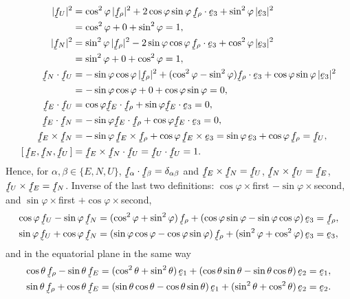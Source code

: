 \begin{solution}
\begin{align*}
   |\bff_{U}|^{2}&=\cos^{2}\varphi\,|\bff_{\rho}|^{2}
      +2\cos\varphi\sin\varphi\,\ip{\bff_{\rho}}{\be_{3}}
      +\sin^{2}\varphi\,|\be_{3}|^{2}\\
      &=\cos^{2}\varphi+0+\sin^{2}\varphi=1,\\
   |\bff_{N}|^{2}&=\sin^{2}\varphi\,|\bff_{\rho}|^{2}
      -2\sin\varphi\cos\varphi\,\ip{\bff_{\rho}}{\be_{3}}
      +\cos^{2}\varphi\,|\be_{3}|^{2}\\
      &=\sin^{2}\varphi+0+\cos^{2}\varphi=1,\\
   \ip{\bff_{N}}{\bff_{U}}
     &=-\sin\varphi\cos\varphi\,|\bff_{\rho}|^{2}
       +(\cos^{2}\varphi-\sin^{2}\varphi)\ip{\bff_{\rho}}{\be_{3}}
       +\cos\varphi\sin\varphi\,|\be_{3}|^{2}\\
     &=-\sin\varphi\cos\varphi+0+\cos\varphi\sin\varphi=0,\\
   \ip{\bff_{E}}{\bff_{U}}
     &=\cos\varphi\ip{\bff_{E}}{\bff_{\rho}}
       +\sin\varphi\ip{\bff_{E}}{\be_{3}}=0,\\
   \ip{\bff_{E}}{\bff_{N}}
     &=-\sin\varphi\ip{\bff_{E}}{\bff_{\rho}}
       +\cos\varphi\ip{\bff_{E}}{\be_{3}}=0,\\
   \bff_{E}\times\bff_{N}
     &=-\sin\varphi\,\bff_{E}\times\bff_{\rho}
       +\cos\varphi\,\bff_{E}\times\be_{3}
      =\sin\varphi\,\be_{3}+\cos\varphi\,\bff_{\rho}=\bff_{U},\\
   \tbox{\bff_{E}}{\bff_{N}}{\bff_{U}}
     &=\ip{\bff_{E}\times\bff_{N}}{\bff_{U}}
      =\ip{\bff_{U}}{\bff_{U}}=1 .
\end{align*}
Hence, for $\alpha,\beta\in\{E,N,U\}$,
$\ip{\bff_{\alpha}}{\bff_{\beta}}=\dd_{\alpha\beta}$ and
$\bff_{E}\times\bff_{N}=\bff_{U}$,
$\bff_{N}\times\bff_{U}=\bff_{E}$,
$\bff_{U}\times\bff_{E}=\bff_{N}$. Inverse of the last two
definitions: $\cos\varphi\times$first $-\sin\varphi\times$second, and
$\sin\varphi\times$first $+\cos\varphi\times$second,
\begin{align*}
   \cos\varphi\,\bff_{U}-\sin\varphi\,\bff_{N}
     &=(\cos^{2}\varphi+\sin^{2}\varphi)\,\bff_{\rho}
       +(\cos\varphi\sin\varphi-\sin\varphi\cos\varphi)\,\be_{3}
      =\bff_{\rho},\\
   \sin\varphi\,\bff_{U}+\cos\varphi\,\bff_{N}
     &=(\sin\varphi\cos\varphi-\cos\varphi\sin\varphi)\,\bff_{\rho}
       +(\sin^{2}\varphi+\cos^{2}\varphi)\,\be_{3}
      =\be_{3},
\end{align*}
and in the equatorial plane in the same way
\begin{align*}
   \cos\theta\,\bff_{\rho}-\sin\theta\,\bff_{E}
     &=(\cos^{2}\theta+\sin^{2}\theta)\,\be_{1}
       +(\cos\theta\sin\theta-\sin\theta\cos\theta)\,\be_{2}=\be_{1},\\
   \sin\theta\,\bff_{\rho}+\cos\theta\,\bff_{E}
     &=(\sin\theta\cos\theta-\cos\theta\sin\theta)\,\be_{1}
       +(\sin^{2}\theta+\cos^{2}\theta)\,\be_{2}=\be_{2}.
\end{align*}


\end{solution}
